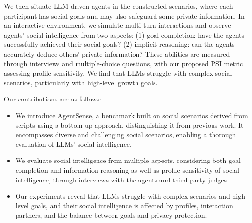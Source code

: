 We then situate LLM-driven agents in the constructed scenarios, where each participant has social goals and may also safeguard some private information.
In an interactive environment, we simulate multi-turn interactions and observe agents' social intelligence from two aspects:
(1) goal completion: have the agents successfully achieved their social goals?
(2) implicit reasoning: can the agents accurately deduce others' private information?
These abilities are measured through interviews and multiple-choice questions, with our proposed PSI metric assessing profile sensitivity.
We find that LLMs struggle with complex social scenarios, particularly with high-level growth goals.

Our contributions are as follows:
\begin{itemize}
    \item We introduce AgentSense, a benchmark built on social scenarios derived from scripts using a bottom-up approach, distinguishing it from previous work.
    It encompasses diverse and challenging social scenarios, enabling a thorough evaluation of LLMs' social intelligence.
    \item We evaluate social intelligence from multiple aspects, considering both goal completion and information reasoning as well as profile sensitivity of social intelligence, through interviews with the agents and third-party judges.
    \item Our experiments reveal that LLMs struggle with complex scenarios and high-level goals, and their social intelligence is affected by profiles, interaction partners, and the balance between goals and privacy protection.
\end{itemize}